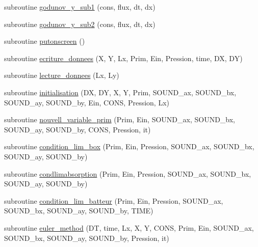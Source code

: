 \begin{DoxyCompactItemize}
\item 
subroutine \mbox{\hyperlink{main2Dv1_01_07copy_08_8f90_a99b7b2764471880074ec2cb4448c3232}{godunov\+\_\+y\+\_\+sub1}} (cons, flux, dt, dx)
\item 
subroutine \mbox{\hyperlink{main2Dv1_01_07copy_08_8f90_af2bc178b3e046a285b7e624ecb7246b8}{godunov\+\_\+y\+\_\+sub2}} (cons, flux, dt, dx)
\item 
subroutine \mbox{\hyperlink{main2Dv1_01_07copy_08_8f90_a8a5b072c001df1496416cc96562c9916}{putonscreen}} ()
\item 
subroutine \mbox{\hyperlink{main2Dv1_01_07copy_08_8f90_aff02bfa8466e376e08fed7a99aae4039}{ecriture\+\_\+donnees}} (X, Y, Lx, Prim, Ein, Pression, time, DX, DY)
\item 
subroutine \mbox{\hyperlink{main2Dv1_01_07copy_08_8f90_a7e06ba833aef7743b6a2f1be79f4bc2e}{lecture\+\_\+donnees}} (Lx, Ly)
\item 
subroutine \mbox{\hyperlink{main2Dv1_01_07copy_08_8f90_afb1c4be5a540eb38b6217aa886b964a5}{initialisation}} (DX, DY, X, Y, Prim, S\+O\+U\+N\+D\+\_\+ax, S\+O\+U\+N\+D\+\_\+bx, S\+O\+U\+N\+D\+\_\+ay, S\+O\+U\+N\+D\+\_\+by, Ein, C\+O\+NS, Pression, Lx)
\item 
subroutine \mbox{\hyperlink{main2Dv1_01_07copy_08_8f90_a7e8756401e9774b000709214edc41a76}{nouvell\+\_\+variable\+\_\+prim}} (Prim, Ein, S\+O\+U\+N\+D\+\_\+ax, S\+O\+U\+N\+D\+\_\+bx, S\+O\+U\+N\+D\+\_\+ay, S\+O\+U\+N\+D\+\_\+by, C\+O\+NS, Pression, it)
\item 
subroutine \mbox{\hyperlink{main2Dv1_01_07copy_08_8f90_a2e4131a2a733710c33c03656b6a7fb34}{condition\+\_\+lim\+\_\+box}} (Prim, Ein, Pression, S\+O\+U\+N\+D\+\_\+ax, S\+O\+U\+N\+D\+\_\+bx, S\+O\+U\+N\+D\+\_\+ay, S\+O\+U\+N\+D\+\_\+by)
\item 
subroutine \mbox{\hyperlink{main2Dv1_01_07copy_08_8f90_a4fa8d6d2b6084471f67e67e44694e3a7}{condlimabsorption}} (Prim, Ein, Pression, S\+O\+U\+N\+D\+\_\+ax, S\+O\+U\+N\+D\+\_\+bx, S\+O\+U\+N\+D\+\_\+ay, S\+O\+U\+N\+D\+\_\+by)
\item 
subroutine \mbox{\hyperlink{main2Dv1_01_07copy_08_8f90_ae64974281df2d6f2222187665fd79e38}{condition\+\_\+lim\+\_\+batteur}} (Prim, Ein, Pression, S\+O\+U\+N\+D\+\_\+ax, S\+O\+U\+N\+D\+\_\+bx, S\+O\+U\+N\+D\+\_\+ay, S\+O\+U\+N\+D\+\_\+by, T\+I\+ME)
\item 
subroutine \mbox{\hyperlink{main2Dv1_01_07copy_08_8f90_a1874243fd0ebdb9c1e1cd78468b4cfac}{euler\+\_\+method}} (DT, time, Lx, X, Y, C\+O\+NS, Prim, Ein, S\+O\+U\+N\+D\+\_\+ax, S\+O\+U\+N\+D\+\_\+bx, S\+O\+U\+N\+D\+\_\+ay, S\+O\+U\+N\+D\+\_\+by, Pression, it)
\end{DoxyCompactItemize}

